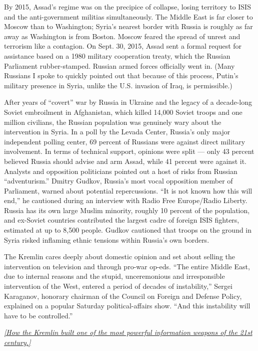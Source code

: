 By 2015, Assad's regime was on the precipice of collapse, losing
territory to ISIS and the anti-government militias simultaneously. The
Middle East is far closer to Moscow than to Washington; Syria's nearest
border with Russia is roughly as far away as Washington is from Boston.
Moscow feared the spread of unrest and terrorism like a contagion. On
Sept. 30, 2015, Assad sent a formal request for assistance based on a
1980 military cooperation treaty, which the Russian Parliament
rubber-stamped. Russian armed forces officially went in. (Many Russians
I spoke to quickly pointed out that because of this process, Putin's
military presence in Syria, unlike the U.S. invasion of Iraq, is
permissible.)

After years of ``covert'' war by Russia in Ukraine and the legacy of a
decade-long Soviet embroilment in Afghanistan, which killed 14,000
Soviet troops and one million civilians, the Russian population was
genuinely wary about the intervention in Syria. In a poll by the Levada
Center, Russia's only major independent polling center, 69 percent of
Russians were against direct military involvement. In terms of technical
support, opinions were split --- only 43 percent believed Russia should
advise and arm Assad, while 41 percent were against it. Analysts and
opposition politicians pointed out a host of risks from Russian
``adventurism.'' Dmitry Gudkov, Russia's most vocal opposition member of
Parliament, warned about potential repercussions. ``It is not known how
this will end,'' he cautioned during an interview with Radio Free
Europe/Radio Liberty. Russia has its own large Muslim minority, roughly
10 percent of the population, and ex-Soviet countries contributed the
largest cadre of foreign ISIS fighters, estimated at up to 8,500 people.
Gudkov cautioned that troops on the ground in Syria risked inflaming
ethnic tensions within Russia's own borders.

The Kremlin cares deeply about domestic opinion and set about selling
the intervention on television and through pro-war op-eds. ``The entire
Middle East, due to internal reasons and the stupid, unceremonious and
irresponsible intervention of the West, entered a period of decades of
instability,'' Sergei Karaganov, honorary chairman of the Council on
Foreign and Defense Policy, explained on a popular Saturday
political-affairs show. ``And this instability will have to be
controlled.''

\href{https://www.nytimes3xbfgragh.onion/2017/09/13/magazine/rt-sputnik-and-russias-new-theory-of-war.html}{\emph{{[}How
the Kremlin built one of the most powerful information weapons of the
21st century.{]}}}

